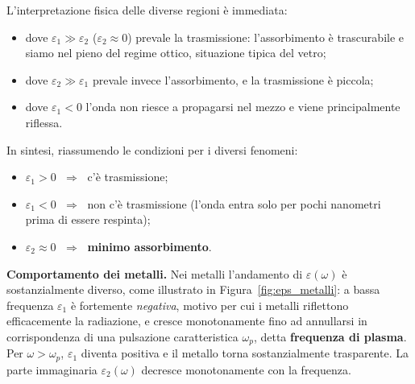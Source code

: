 L'interpretazione fisica delle diverse regioni è immediata:

\begin{itemize}
    \item dove \( \varepsilon_1 \gg \varepsilon_2 \) (\( \varepsilon_2 \approx 0 \)) prevale la trasmissione: l'assorbimento è trascurabile e siamo nel pieno del regime ottico, situazione tipica del vetro;
    \item dove \( \varepsilon_2 \gg \varepsilon_1 \) prevale invece l'assorbimento, e la trasmissione è piccola;
    \item dove \( \varepsilon_1 < 0 \) l'onda non riesce a propagarsi nel mezzo e viene principalmente riflessa.
\end{itemize}

In sintesi, riassumendo le condizioni per i diversi fenomeni:

\begin{itemize}
    \item \( \varepsilon_1 > 0 \) \(\;\Longrightarrow\;\) c'è trasmissione;
    \item \( \varepsilon_1 < 0 \) \(\;\Longrightarrow\;\) non c'è trasmissione (l'onda entra solo per pochi nanometri prima di essere respinta);
    \item \( \varepsilon_2 \approx 0 \) \(\;\Longrightarrow\;\) \textbf{minimo assorbimento}.
\end{itemize}


\textbf{Comportamento dei metalli.} Nei metalli l'andamento di \( \varepsilon(\omega) \) è sostanzialmente diverso, come illustrato in Figura~\ref{fig:eps_metalli}: a bassa frequenza \( \varepsilon_1 \) è fortemente \emph{negativa}, motivo per cui i metalli riflettono efficacemente la radiazione, e cresce monotonamente fino ad annullarsi in corrispondenza di una pulsazione caratteristica \( \omega_p \), detta \textbf{frequenza di plasma}. Per \( \omega > \omega_p \), \( \varepsilon_1 \) diventa positiva e il metallo torna sostanzialmente trasparente. La parte immaginaria \( \varepsilon_2(\omega) \) decresce monotonamente con la frequenza.

